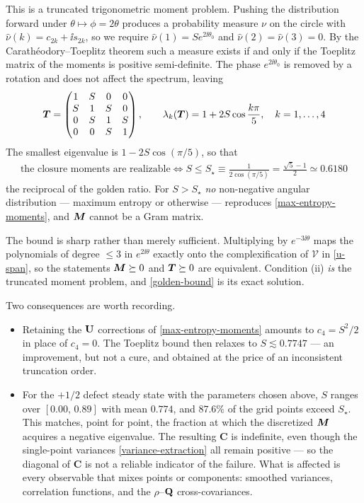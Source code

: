 \documentclass[a5paper]{article}
\begin{document}
This is a truncated trigonometric moment problem. Pushing the distribution forward under $\theta \mapsto \phi = 2\theta$ produces a probability measure $\nu$ on the circle with $\hat\nu(k) = c_{2k} + \ii s_{2k}$, so we require $\hat\nu(1) = S e^{2\ii\theta_0}$ and $\hat\nu(2) = \hat\nu(3) = 0$. By the Carath\'eodory--Toeplitz theorem such a measure exists if and only if the Toeplitz matrix of the moments is positive semi-definite. The phase $e^{2\ii\theta_0}$ is removed by a rotation and does not affect the spectrum, leaving
\begin{align}
    \label{toeplitz}
    \boldsymbol T = \begin{pmatrix}
        1 & S & 0 & 0 \\
        S & 1 & S & 0 \\
        0 & S & 1 & S \\
        0 & 0 & S & 1
    \end{pmatrix},
    \qquad
    \lambda_k(\boldsymbol T) = 1 + 2 S \cos\frac{k\pi}{5},
    \quad k = 1,\dots,4
\end{align}
The smallest eigenvalue is $1 - 2S\cos(\pi/5)$, so that
\begin{align}
    \label{golden-bound}
    \boxed{\ \ \text{the closure moments are realizable}
    \iff
    S \le S_\star \equiv \frac{1}{2\cos(\pi/5)} = \frac{\sqrt{5}-1}{2} \simeq 0.6180\ \ }
\end{align}
the reciprocal of the golden ratio. For $S > S_\star$ \emph{no} non-negative angular distribution --- maximum entropy or otherwise --- reproduces \eqref{max-entropy-moments}, and $\boldsymbol M$ cannot be a Gram matrix.

The bound is sharp rather than merely sufficient. Multiplying by $e^{-3\ii\theta}$ maps the polynomials of degree $\le 3$ in $e^{2\ii\theta}$ exactly onto the complexification of $\mathcal{V}$ in \eqref{u-span}, so the statements $\boldsymbol M \succeq 0$ and $\boldsymbol T \succeq 0$ are equivalent. Condition (ii) \emph{is} the truncated moment problem, and \eqref{golden-bound} is its exact solution.

Two consequences are worth recording.
\begin{itemize}
    \item Retaining the $\mathbf{U}$ corrections of \eqref{max-entropy-moments} amounts to $c_4 = S^2/2$ in place of $c_4 = 0$. The Toeplitz bound then relaxes to $S \lesssim 0.7747$ --- an improvement, but not a cure, and obtained at the price of an inconsistent truncation order.
    \item For the $+1/2$ defect steady state with the parameters chosen above, $S$ ranges over $[0.00,\,0.89]$ with mean $0.774$, and $87.6\%$ of the grid points exceed $S_\star$. This matches, point for point, the fraction at which the discretized $\boldsymbol M$ acquires a negative eigenvalue. The resulting $\mathbf{C}$ is indefinite, even though the single-point variances \eqref{variance-extraction} all remain positive --- so the diagonal of $\mathbf{C}$ is not a reliable indicator of the failure. What is affected is every observable that mixes points or components: smoothed variances, correlation functions, and the $\rho$--$\mathbf{Q}$ cross-covariances.
\end{itemize}
 
\end{document}
